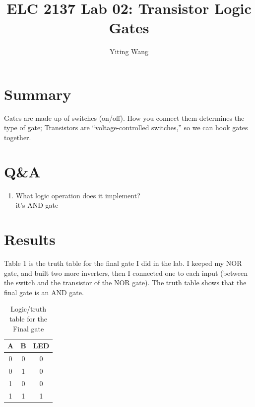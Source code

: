 \documentclass[11pt]{article}
\begin{document}
	
	\title{ELC 2137 Lab 02: Transistor Logic Gates}
	\author{Yiting Wang}
	
	\maketitle
	
	
	\section*{Summary}
	
		Gates are made up of switches (on/off). How you connect them determines the type of gate; Transistors are “voltage-controlled switches,” so we can hook gates together.  \\
		
	
	
	\section*{Q\&A}
	
	\begin{enumerate}
		\item What logic operation does it implement?\\
		it's AND gate\\
	\end{enumerate}
	
	
	
	\section*{Results}
	
		Table 1 is the truth table for the final gate I did in the lab. I keeped my NOR gate, and built two more inverters, then I connected one to each input (between the switch and the transistor of the NOR gate).   The truth table shows that the final gate is an AND gate.\\
	\begin{table}[ht]\centering
		\caption{Logic/truth table for the Final gate}
		\label{tbl:example_table}
		\begin{tabular}{cc|c}
			\toprule
			A & B & LED \\
			\midrule
			0 & 0 & 0 \\
			0 & 1 & 0 \\
			1 & 0 & 0 \\
			1 & 1 & 1 \\
			\bottomrule
		\end{tabular}
	\end{table}
	
\end{document}
